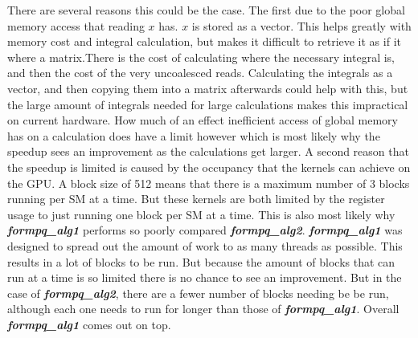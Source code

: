\documentclass[12pt]{report}
\newcommand{\kernel}[1]{\textit{\textbf{#1}}}
\begin{document}
There are several reasons this could be the case. The first due to the poor global memory access that reading $x$ has. $x$ is stored as a vector. This helps greatly with memory cost and integral calculation, but makes it difficult to retrieve it as if it where a matrix.There is the cost of calculating where the necessary integral is, and then the cost of the very uncoalesced reads. Calculating the integrals as a vector, and then copying them into a matrix afterwards could help with this, but the large amount of integrals needed for large calculations makes this impractical on current hardware. How much of an effect inefficient access of global memory has on a calculation does have a limit however which is most likely why the speedup sees an improvement as the calculations get larger. A second reason that the speedup is limited is caused by the occupancy that the kernels can achieve on the GPU. A block size of 512 means that there is a maximum number of 3 blocks running per SM at a time. But these kernels are both limited by the register usage to just running one block per SM at a time. This is also most likely why \kernel{formpq\_alg1} performs so poorly compared \kernel{formpq\_alg2}. \kernel{formpq\_alg1} was designed to spread out the amount of work to as many threads as possible. This results in a lot of blocks to be run. But because the amount of blocks that can run at a time is so limited there is no chance to see an improvement. But in the case of \kernel{formpq\_alg2}, there are a fewer number of blocks needing be be run, although each one needs to run for longer than those of \kernel{formpq\_alg1}. Overall \kernel{formpq\_alg1} comes out on top.
\end{document}
